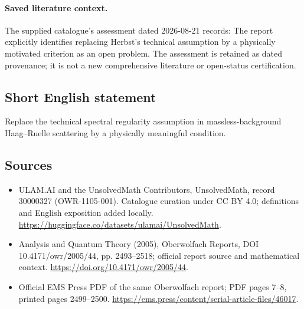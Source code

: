 \documentclass[11pt]{article}
\begin{document}
\paragraph{Saved literature context.} The supplied catalogue's assessment dated 2026-08-21 records: The report explicitly identifies replacing Herbst's technical assumption by a physically motivated criterion as an open problem. The assessment is retained as dated provenance; it is not a new comprehensive literature or open-status certification.
\subsection{Short English statement}
Replace the technical spectral regularity assumption in massless-background Haag--Ruelle scattering by a physically meaningful condition.
\subsection{Sources}
\begin{itemize}
\item[\hypertarget{source:30000327:1}{S1}] ULAM.AI and the UnsolvedMath Contributors, UnsolvedMath, record 30000327 (OWR-1105-001). Catalogue curation under CC BY 4.0; definitions and English exposition added locally.
\url{https://huggingface.co/datasets/ulamai/UnsolvedMath}.
\item[\hypertarget{source:30000327:2}{S2}] Analysis and Quantum Theory (2005), Oberwolfach Reports, DOI 10.4171/owr/2005/44, pp. 2493--2518; official report source and mathematical context.
\url{https://doi.org/10.4171/owr/2005/44}.
\item[\hypertarget{source:30000327:3}{S3}] Official EMS Press PDF of the same Oberwolfach report; PDF pages 7--8, printed pages 2499--2500.
\url{https://ems.press/content/serial-article-files/46017}.
\end{itemize}
\label{end:30000327}
\end{document}
